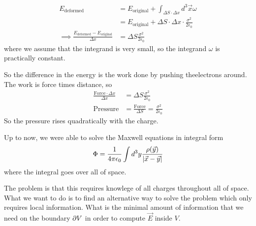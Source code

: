 \begin{ex}
\begin{align*}
  E_{\text{deformed}} &= E_{\text{original}} + \int_{\Delta S \cdot \Delta x}d^{3} \vec{x} \omega\\
  &= E_{\text{original}} + \Delta S \cdot \Delta x \cdot \frac{\sigma^{2}}{2 \epsilon_0}\\
  \implies \frac{E_{\text{deformed}} - E_{\text{original}}}{\Delta x} &= \Delta S \frac{\sigma^{2}}{2 \epsilon_0}
\end{align*}
where we assume that the integrand is very small, so the integrand $\omega$ is practically constant.

So the difference in the energy is the work done by pushing theelectrons around. The work is force times distance, so 
\begin{align*}
  \frac{\text{Force} \cdot \Delta x}{\Delta x} &= \Delta S \frac{\sigma^{2}}{2 \epsilon_0}\\
  \text{Pressure} &= \frac{\text{Force}}{\Delta S}  = \frac{\sigma^{2}}{2 \epsilon_0}
\end{align*}
So the pressure rises quadratically with the charge.
\end{ex}

Up to now, we were able to solve the Maxwell equations in integral form
\begin{align*}
\Phi = \frac{1}{4 \pi \epsilon_0} \int d^{3} y \frac{\rho(\vec{y})}{\vert\vec{x} - \vec{y}\vert}
\end{align*}
where the integral goes over all of space. 

The problem is that this requires knowlege of all charges throughout all of space.
What we want to do is to find an alternative way to solve the problem which only requires local information.
What is the minimal amount of information that we need on the boundary $\partial V$ in order to compute $\vec{E}$ inside $V$.

